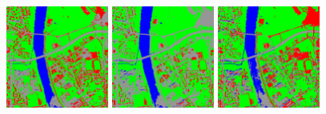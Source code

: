 \begin{figure}[!h]
  \center
  \includegraphics[width=0.3\textwidth]{../Art/MonteverdiImages/classification_chain_fancyclassif_CMR_input.png}
  \includegraphics[width=0.3\textwidth]{../Art/MonteverdiImages/classification_chain_fancyclassif_CMR_input_2.png}
  \includegraphics[width=0.3\textwidth]{../Art/MonteverdiImages/classification_chain_fancyclassif_CMR_input_3.png}
  \label{fig:ClassificationMapFusionApplication}
\end{figure}




